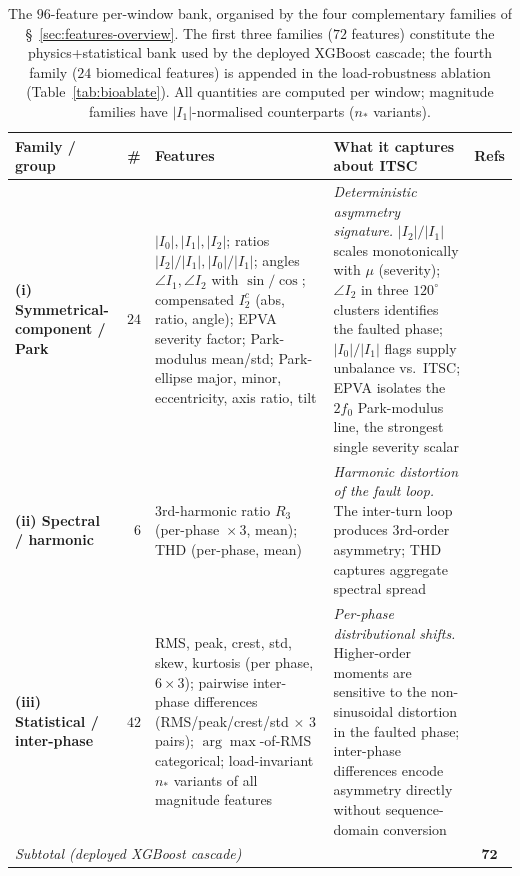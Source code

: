 \documentclass[journal]{IEEEtran}
\begin{document}
\begin{table}[!t]
\caption{The $96$-feature per-window bank, organised by the four complementary families
of \S~\ref{sec:features-overview}. The first three families ($72$ features) constitute
the physics+statistical bank used by the deployed XGBoost cascade; the fourth family
($24$ biomedical features) is appended in the load-robustness ablation
(Table~\ref{tab:bioablate}). All quantities are computed per window; magnitude families
have $|I_1|$-normalised counterparts ($n_{\!*}$ variants).}
\label{tab:features}
\centering
\footnotesize
\begin{tabular}{@{}p{} c p{} p{} c@{}}
\toprule
Family / group & \# & Features & What it captures about ITSC & Refs \\
\midrule
\textbf{(i) Symmetrical-component / Park}
& $24$
& $|I_0|, |I_1|, |I_2|$; ratios $|I_2|/|I_1|, |I_0|/|I_1|$; angles $\angle I_1, \angle I_2$
  with $\sin/\cos$; compensated $I_2^{c}$ (abs, ratio, angle); EPVA severity factor;
  Park-modulus mean/std; Park-ellipse major, minor, eccentricity, axis ratio, tilt
& \emph{Deterministic asymmetry signature.} $|I_2|/|I_1|$ scales monotonically with $\mu$
  (severity); $\angle I_2$ in three $120^\circ$ clusters identifies the faulted phase;
  $|I_0|/|I_1|$ flags supply unbalance vs.\ ITSC; EPVA isolates the $2f_0$ Park-modulus
  line, the strongest single severity scalar
& \cite{cardoso2001,garcia2024,ruzimov2025,mazzoletti2025} \\[2pt]
\textbf{(ii) Spectral / harmonic}
& $\phantom{0}6$
& $3$rd-harmonic ratio $R_3$ (per-phase $\!\times 3$, mean); THD (per-phase, mean)
& \emph{Harmonic distortion of the fault loop.} The inter-turn loop produces $3$rd-order
  asymmetry; THD captures aggregate spectral spread
& \cite{penman1994,singh2020} \\[2pt]
\textbf{(iii) Statistical / inter-phase}
& $42$
& RMS, peak, crest, std, skew, kurtosis (per phase, $6\!\times\!3$); pairwise inter-phase
  differences (RMS/peak/crest/std$\,\times\,3$ pairs); $\arg\max$-of-RMS categorical;
  load-invariant $n_{\!*}$ variants of all magnitude features
& \emph{Per-phase distributional shifts.} Higher-order moments are sensitive to the
  non-sinusoidal distortion in the faulted phase; inter-phase differences encode
  asymmetry directly without sequence-domain conversion
& \cite{pietrzak2022,aasar2026} \\[2pt]
\multicolumn{4}{l}{\textsl{Subtotal (deployed XGBoost cascade)}} & $\mathbf{72}$ \\

\end{tabular}
\end{table}
\end{document}
